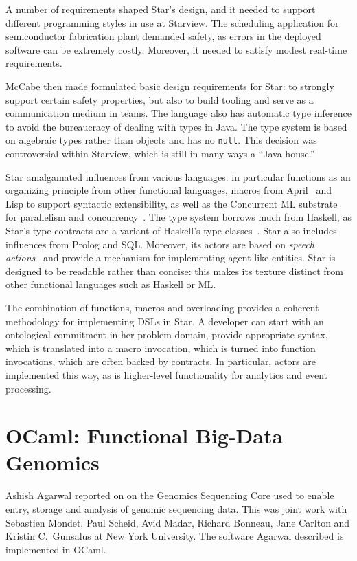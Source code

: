 \documentclass{jfp1}
\begin{document}
A number of requirements shaped Star's design, and it needed to support
different programming styles in use at Starview.  The
scheduling application for semiconductor fabrication plant demanded safety, as errors in
the deployed software can be extremely costly.  Moreover, it needed to
satisfy modest real-time requirements.

McCabe then made formulated  basic design requirements for Star: to
strongly support certain safety properties, but also to build tooling
and serve as a communication medium in teams.  The language also has automatic type
inference to avoid the bureaucracy of dealing with types in Java.
The type system is based on algebraic types rather than objects and has no
\texttt{null}. This decision was controversial within Starview,
which is still in many ways a ``Java house.''

Star amalgamated influences from various languages: in particular
functions as an organizing principle from other functional languages,
macros from April~\cite{fgm-klc:95} and Lisp to support syntactic
extensibility, as well as the Concurrent ML substrate for parallelism
and concurrency~\cite{Reppy1999}.  The type system borrows much from
Haskell, as Star's type contracts are a variant of Haskell's type
classes~\cite{WadlerBlott1989}.  Star also includes influences from
Prolog and SQL.  Moreover, its actors are based on \textit{speech
  actions}~\cite{searle:69} and provide a mechanism for implementing
agent-like entities. Star is designed to be readable rather than
concise: this makes its texture distinct from other functional
languages such as Haskell or ML.

The combination of functions, macros and overloading provides a
coherent methodology for implementing DSLs in Star.  A developer can
start with an ontological commitment in her problem domain, provide
appropriate syntax, which is translated into a macro invocation, which
is turned into function invocations, which are often backed by
contracts.  In particular, actors are implemented this way, as is
higher-level functionality for analytics and event processing.

\section{OCaml: Functional Big-Data Genomics}

Ashish Agarwal reported on on the Genomics Sequencing Core used
to enable entry, storage and analysis of genomic sequencing data.
This was joint work with Sebastien Mondet, Paul
Scheid, Avid Madar, Richard Bonneau, Jane Carlton and Kristin
C.\ Gunsalus at New York University. 
The software Agarwal described is implemented in OCaml.
\end{document}
